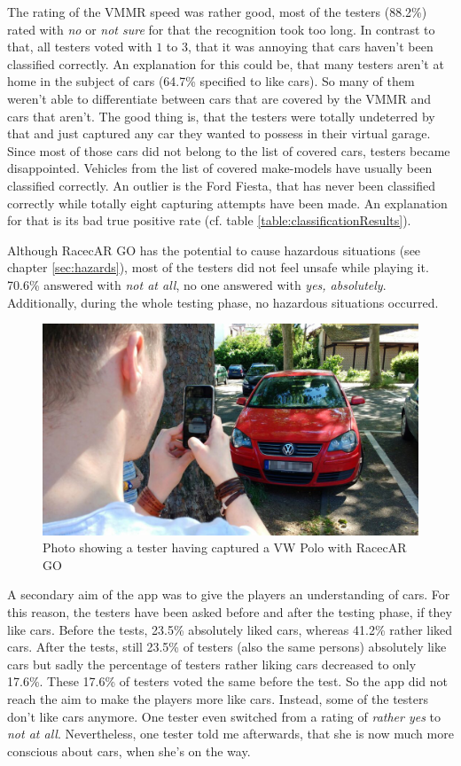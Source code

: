 The rating of the VMMR speed was rather good, most of the testers (88.2\%) rated with \emph{no} or \emph{not sure} for that the recognition took too long. In contrast to that, all testers voted with $1$ to $3$, that it was annoying that cars haven't been classified correctly. An explanation for this could be, that many testers aren't at home in the subject of cars (64.7\% specified to like cars). So many of them weren't able to differentiate between cars that are covered by the VMMR and cars that aren't. The good thing is, that the testers were totally undeterred by that and just captured any car they wanted to possess in their virtual garage. Since most of those cars did not belong to the list of covered cars, testers became disappointed. Vehicles from the list of covered make-models have usually been classified correctly. An outlier is the Ford Fiesta, that has never been classified correctly while totally eight capturing attempts have been made. An explanation for that is its bad true positive rate (cf. table \ref{table:classificationResults}).

Although RacecAR GO has the potential to cause hazardous situations (see chapter \ref{sec:hazards}), most of the testers did not feel unsafe while playing it. 70.6\% answered with \emph{not at all}, no one answered with \emph{yes, absolutely}. Additionally, during the whole testing phase, no hazardous situations occurred.
\begin{figure}[btph]
  \centering
        \includegraphics[width=.95\linewidth]{gfx/eval5}
        \caption{Photo showing a tester having captured a VW Polo with RacecAR GO}
        \label{fig:eval5}
\end{figure}

A secondary aim of the app was to give the players an understanding of cars. For this reason, the testers have been asked before and after the testing phase, if they like cars. Before the tests, 23.5\% absolutely liked cars, whereas 41.2\% rather liked cars. After the tests, still 23.5\% of testers (also the same persons) absolutely like cars but sadly the percentage of testers rather liking cars decreased to only 17.6\%. These 17.6\% of testers voted the same before the test. So the app did not reach the aim to make the players more like cars. Instead, some of the testers don't like cars anymore. One tester even switched from a rating of \emph{rather yes} to \emph{not at all}. Nevertheless, one tester told me afterwards, that she is now much more conscious about cars, when she's on the way.

